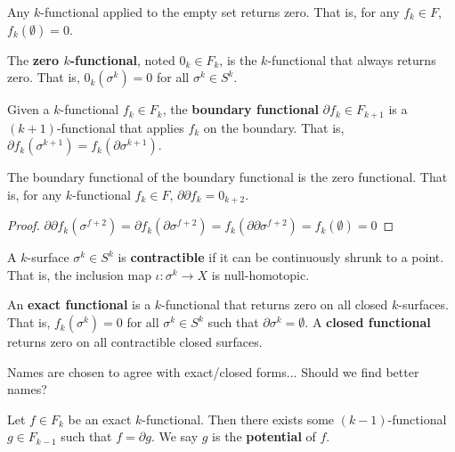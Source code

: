 \documentclass[11pt,letterpaper,fleqn]{memoir}
\begin{document}
\begin{coro}
	Any $k$-functional applied to the empty set returns zero. That is, for any $f_k \in F$, $f_k(\emptyset) = 0$.
\end{coro}

\begin{defn}
	The \textbf{zero $k$-functional}, noted $0_k \in F_k$, is the $k$-functional that always returns zero. That is, $0_k(\sigma^k) = 0$ for all $\sigma^k \in S^k$.
\end{defn}


\begin{defn}
	Given a $k$-functional $f_k \in F_k$, the \textbf{boundary functional} $\partial f_k \in F_{k+1}$ is a $(k+1)$-functional that applies $f_k$ on the boundary. That is, $\partial f_k(\sigma^{k+1}) = f_k(\partial \sigma^{k+1})$. 
\end{defn}

\begin{coro}
	The boundary functional of the boundary functional is the zero functional. That is, for any $k$-functional $f_k \in F$, $\partial \partial f_k = 0_{k+2}$.
\end{coro}

\begin{proof}
	$\partial \partial f_k (\sigma ^{f+2}) = \partial f_k (\partial \sigma ^{f+2}) = f_k (\partial \partial \sigma ^{f+2}) = f_k(\emptyset) = 0$
\end{proof}

\begin{defn}
	A $k$-surface $\sigma^k \in S^k$ is \textbf{contractible} if it can be continuously shrunk to a point. That is, the inclusion map $\iota : \sigma^k \to X$ is null-homotopic.
\end{defn}

\begin{defn}
	An \textbf{exact functional} is a $k$-functional that returns zero on all closed $k$-surfaces. That is, $f_k(\sigma^k) = 0$ for all $\sigma^k \in S^k$ such that $\partial\sigma^k = \emptyset$. A \textbf{closed functional} returns zero on all contractible closed surfaces.
\end{defn}

\begin{remark}
	Names are chosen to agree with exact/closed forms... Should we find better names?
\end{remark}

\begin{prop}
	Let $f \in F_k$ be an exact $k$-functional. Then there exists some $(k-1)$-functional $g \in F_{k-1}$ such that $f = \partial g$. We say $g$ is the \textbf{potential} of $f$.
\end{prop}
\end{document}
